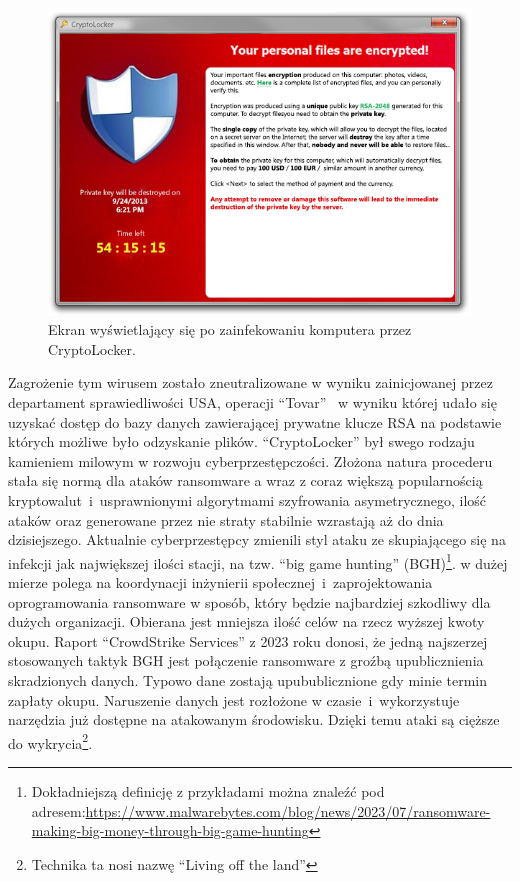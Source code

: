 \begin{figure}[H]
    \centering
    \includegraphics[width=0.75\linewidth]{rysunki/cryptolocker.png}
    \caption{Ekran wyświetlający się po zainfekowaniu komputera przez CryptoLocker\protect\footnotemark.}
    \label{fig:enter-label}
\end{figure}
Zagrożenie tym wirusem zostało zneutralizowane w wyniku zainicjowanej przez departament sprawiedliwości USA, operacji \foreignquote{english}{Tovar}~\cite{tovar} w wyniku której udało się uzyskać dostęp do bazy danych zawierającej prywatne klucze RSA na podstawie których możliwe było odzyskanie plików.
\newline
\foreignquote{english}{CryptoLocker} był swego rodzaju kamieniem milowym w rozwoju cyberprzestępczości. Złożona natura procederu stała się normą dla ataków ransomware a wraz z coraz większą popularnością kryptowalut~i~usprawnionymi algorytmami szyfrowania asymetrycznego, ilość ataków oraz generowane przez nie straty stabilnie wzrastają aż do dnia dzisiejszego.
\newline
Aktualnie cyberprzestępcy zmienili styl ataku ze skupiającego się na infekcji jak największej ilości stacji, na tzw. \foreignquote{english}{big game hunting} (BGH)\footnote{Dokładniejszą definicję z przykładami można znaleźć pod adresem:\newline \url{https://www.malwarebytes.com/blog/news/2023/07/ransomware-making-big-money-through-big-game-hunting}}.  w dużej mierze polega na koordynacji inżynierii społecznej~i~zaprojektowania oprogramowania ransomware w sposób, który będzie najbardziej szkodliwy dla dużych organizacji. Obierana jest mniejsza ilość celów na rzecz wyższej kwoty okupu. Raport \foreignquote{english}{CrowdStrike Services} z 2023 roku donosi, że jedną najszerzej stosowanych taktyk BGH jest połączenie ransomware z groźbą upublicznienia skradzionych danych. Typowo dane zostają upubublicznione gdy minie termin zapłaty okupu. Naruszenie danych jest rozłożone w czasie~i~wykorzystuje narzędzia już dostępne na atakowanym środowisku. Dzięki temu ataki są cięższe do wykrycia\footnote{Technika ta nosi nazwę \foreignquote{english}{Living off the land}}.
